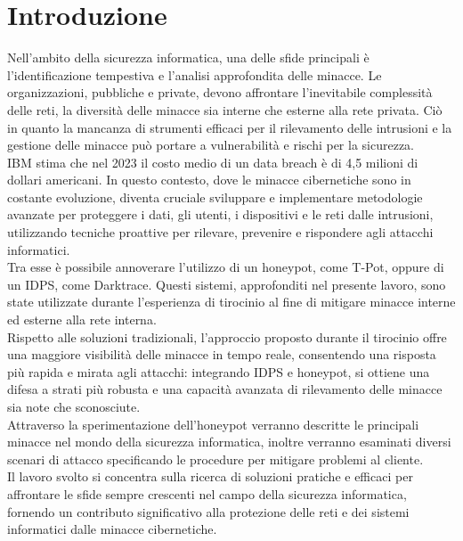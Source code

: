 \chapter{Introduzione}
Nell'ambito della sicurezza informatica, una delle sfide principali è l'identificazione tempestiva e l'analisi approfondita delle minacce. Le organizzazioni, pubbliche e private, devono affrontare l'inevitabile complessità delle reti, la diversità delle minacce sia interne che esterne alla rete privata. Ciò in quanto la mancanza di strumenti efficaci per il rilevamento delle intrusioni e la gestione delle minacce può portare a vulnerabilità e rischi per la sicurezza.\\
IBM stima che nel 2023 il costo medio di un data breach è di 4,5 milioni di dollari americani. In questo contesto, dove le minacce cibernetiche sono in costante evoluzione, diventa cruciale sviluppare e implementare metodologie avanzate per proteggere i dati, gli utenti, i dispositivi e le reti dalle intrusioni, utilizzando tecniche proattive per rilevare, prevenire e rispondere agli attacchi informatici.\\
Tra esse è possibile annoverare l’utilizzo di un honeypot, come T-Pot, oppure di un IDPS, come Darktrace. Questi sistemi, approfonditi nel presente lavoro, sono state utilizzate durante l’esperienza di tirocinio al fine di mitigare minacce interne ed esterne alla rete interna.\\
Rispetto alle soluzioni tradizionali, l’approccio proposto durante il tirocinio offre una maggiore visibilità delle minacce in tempo reale, consentendo una risposta più rapida e mirata agli attacchi: integrando IDPS e honeypot, si ottiene una difesa a strati più robusta e una capacità avanzata di rilevamento delle minacce sia note che sconosciute.\\
Attraverso la sperimentazione dell'honeypot verranno descritte le principali minacce nel mondo della sicurezza informatica, inoltre verranno esaminati diversi scenari di attacco specificando le procedure per mitigare problemi al cliente.\\
Il lavoro svolto si concentra sulla ricerca di soluzioni pratiche e efficaci per affrontare le sfide sempre crescenti nel campo della sicurezza informatica, fornendo un contributo significativo alla protezione delle reti e dei sistemi informatici dalle minacce cibernetiche.